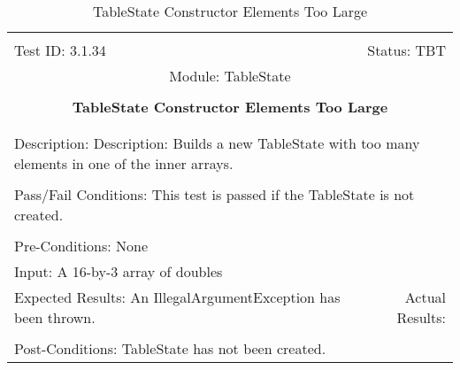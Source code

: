 \documentclass[titlepage]{article}
\begin{document}
\begin{center}%
\begin{table}[h!]
\begin{tabular}{|l r|}\hline&\\[-2mm]
	Test ID: 3.1.34	&Status: TBT\\[-3mm]
	\multicolumn{2}{|c|}{Module: TableState}\\&\\
	\multicolumn{2}{|c|}{\textbf{\large{TableState Constructor Elements Too Large}}}\\&\\\hline&\\[-3mm]
	\multicolumn{2}{|p{\textwidth}|}{Description: Description: Builds a new TableState with too many elements in one of the inner arrays.}\\[1mm]\hline&\\[-3mm]
	\multicolumn{2}{|p{\textwidth}|}{Pass/Fail Conditions: This test is passed if the TableState is not created.}\\[1mm]\hline&\\[-3mm]
	\multicolumn{2}{|p{\textwidth}|}{Pre-Conditions: None}\\[4mm]
	\multicolumn{2}{|p{\textwidth}|}{Input: A 16-by-3 array of doubles}\\[2mm]\hline
	\multicolumn{1}{|p{0.49\textwidth}}{Expected Results: An IllegalArgumentException has been thrown.}	&\multicolumn{1}{|p{0.45\textwidth}|}{Actual Results: }\\\hline&\\[-3mm]
	\multicolumn{2}{|p{\textwidth}|}{Post-Conditions: TableState has not been created.}\\\hline
\end{tabular}
\caption{TableState Constructor Elements Too Large}
\end{table}
\end{center}
\end{document}
